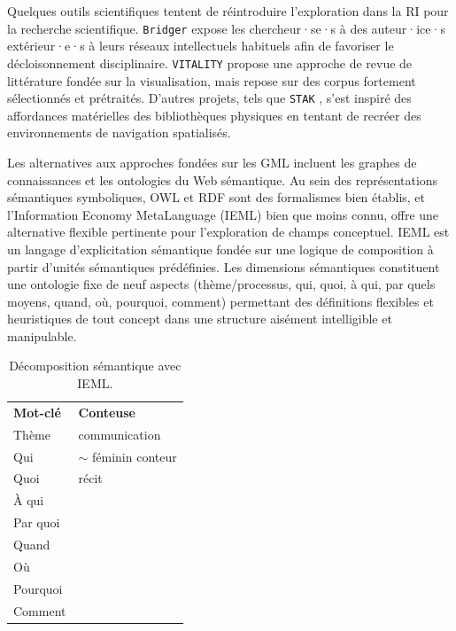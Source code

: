 \documentclass[final,fra]{anthology-ch} %
\begin{document}
Quelques outils scientifiques tentent de réintroduire l'exploration dans
la RI pour la recherche scientifique. \texttt{Bridger}
\autocite{portenoyBurstingScientificFilter2022} expose les
chercheur·se·s à des auteur·ice·s extérieur·e·s à leurs réseaux
intellectuels habituels afin de favoriser le décloisonnement
disciplinaire. \texttt{VITALITY}
\autocite{narechaniaVITALITYPromotingSerendipitous2022} propose une
approche de revue de littérature fondée sur la visualisation, mais
repose sur des corpus fortement sélectionnés et prétraités. D'autres
projets, tels que \texttt{STAK}
\autocite{martinSTAKSerendipitousTool2017}, s'est inspiré des
affordances matérielles des bibliothèques physiques en tentant de
recréer des environnements de navigation spatialisés.

Les alternatives aux approches fondées sur les GML incluent les graphes de 
connaissances et les ontologies du Web sémantique. Au sein des représentations 
sémantiques symboliques, OWL et RDF sont des formalismes bien établis, et 
l'Information Economy MetaLanguage (IEML) \cite{levySemanticComputingIEML2023} 
bien que moins connu, offre une alternative flexible pertinente pour l'exploration 
de champs conceptuel. IEML est un langage d'explicitation sémantique fondée sur 
une logique de composition à partir d'unités sémantiques prédéfinies. Les 
dimensions sémantiques constituent une ontologie fixe de neuf aspects 
(thème/processus, qui, quoi, à qui, par quels moyens, quand, où, pourquoi, 
comment) permettant des définitions flexibles et heuristiques de tout concept 
dans une structure aisément intelligible et manipulable.

\begin{table}[h]
    \centering
    \begin{tabular}{ll}
    \textbf{Mot-clé} & \textbf{Conteuse} \\
    Thème       & communication \\
    Qui         & $\sim$ féminin conteur \\
    Quoi        & récit \\
    À qui       & \\
    Par quoi    & \\
    Quand       & \\
    Où          & \\
    Pourquoi    & \\
    Comment     & \\
    \end{tabular}
    \caption{Décomposition sémantique avec IEML.}
    \label{tab:ieml}
\end{table}
\end{document}
